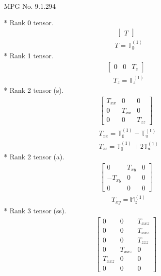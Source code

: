 \documentclass[fleqn,8pt,landscape]{jsarticle}
\begin{document}
\setcounter{MaxMatrixCols}{32}

\renewcommand{\tablename}{Table~}
\renewcommand{\figurename}{Figure~}
\begin{center}
\LARGE
MPG No. 9.1.29\quad$4$
\end{center}
* Rank 0 tensor.
\begin{align*}
\begin{bmatrix} T \end{bmatrix}
\end{align*}
\begin{align*}
& T = \mathbb{T}_{0}^{(1)}
\end{align*}
* Rank 1 tensor.
\begin{align*}
\begin{bmatrix} 0 & 0 & T_{z} \end{bmatrix}
\end{align*}
\begin{align*}
& T_{z} = \mathbb{T}_{z}^{(1)}
\end{align*}
* Rank 2 tensor (s).
\begin{align*}
\begin{bmatrix} T_{xx} & 0 & 0 \\ 0 & T_{xx} & 0 \\ 0 & 0 & T_{zz} \end{bmatrix}
\end{align*}
\begin{align*}
& T_{xx} = \mathbb{T}_{0}^{(1)} - \mathbb{T}_{u}^{(1)} \\
& T_{zz} = \mathbb{T}_{0}^{(1)} + 2 \mathbb{T}_{u}^{(1)}
\end{align*}
* Rank 2 tensor (a).
\begin{align*}
\begin{bmatrix} 0 & T_{xy} & 0 \\ - T_{xy} & 0 & 0 \\ 0 & 0 & 0 \end{bmatrix}
\end{align*}
\begin{align*}
& T_{xy} = \mathbb{M}_{z}^{(1)}
\end{align*}
* Rank 3 tensor (ss).
\begin{align*}
\begin{bmatrix} 0 & 0 & T_{xxz} \\ 0 & 0 & T_{xxz} \\ 0 & 0 & T_{zzz} \\ 0 & T_{xxz} & 0 \\ T_{xxz} & 0 & 0 \\ 0 & 0 & 0 \end{bmatrix}
\end{align*}
\end{document}
